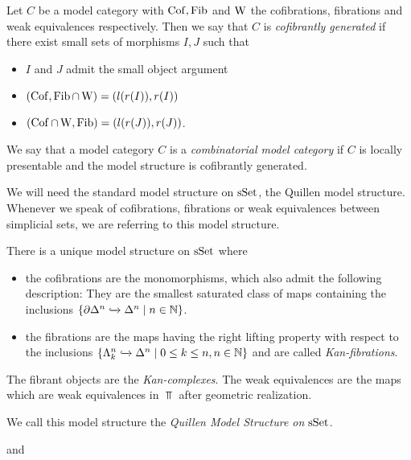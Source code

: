 \begin{reference}
    \cite*[Proposition 2.1.9]{cisinski_2019}
\end{reference}
\begin{definition}
    Let $C$ be a model category with $\operatorname{Cof},\operatorname{Fib}$ and $\operatorname{W}$ the cofibrations, fibrations and weak equivalences respectively.
    Then we say that $C$ is \emph{cofibrantly generated} if there exist small sets of morphisms $I,J$ such that
    \begin{itemize}
        \item $I$ and $J$ admit the small object argument
        \item $(\operatorname{Cof},\operatorname{Fib}\cap\operatorname{W})=(l(r(I)),r(I))$
        \item $(\operatorname{Cof}\cap\operatorname{W},\operatorname{Fib})=(l(r(J)),r(J))$.
    \end{itemize} 
\end{definition}
\begin{definition}
    We say that a model category $C$ is a \emph{combinatorial model category} if $C$ is locally presentable and the model structure is cofibrantly generated.
\end{definition}
We will need the standard model structure on $\sSet$, the Quillen model structure. 
Whenever we speak of cofibrations, fibrations or weak equivalences between simplicial sets, we are referring to this model structure.
\begin{thm}[Quillen Model Structure on $\sSet$] %
    There is a unique model structure on $\sSet$ where 
    \begin{itemize}
        \item the cofibrations are the monomorphisms, which also admit the following description: 
        They are the smallest saturated class of maps containing the inclusions $\left\lbrace\partial\Delta^n\xhookrightarrow{}\Delta^n\mid n\in\mathbb{N}\right\rbrace$.
        \item the fibrations are the maps having the right lifting property with respect to the inclusions $\left\lbrace\Lambda_k^n\xhookrightarrow{}\Delta^n\mid 0\leq k\leq n, n\in\mathbb{N}\right\rbrace$ and are called \emph{Kan-fibrations}.
    \end{itemize}
    The fibrant objects are the \emph{Kan-complexes}.
    The weak equivalences are the maps which are weak equivalences in $\Top$ after geometric realization.

    We call this model structure the \emph{Quillen Model Structure on $\sSet$}.
    \begin{reference}
        \cite[Theorem 3.1.8 and Theorem 3.1.29]{cisinski_2019} and \cite[Chap. II, \S 3, Theorem 1]{Quillen1967}
    \end{reference}
\end{thm}

